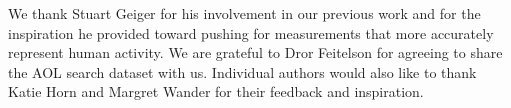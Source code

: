 We thank Stuart Geiger for his involvement in our previous work and for the inspiration he provided toward pushing for measurements that more accurately represent human activity.  We are grateful to Dror Feitelson for agreeing to share the AOL search dataset with us. Individual authors would also like to thank Katie Horn and Margret Wander for their feedback and inspiration.
